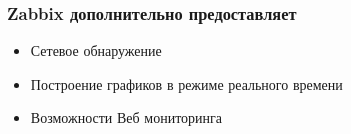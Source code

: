 \begin{frame}[fragile]
    \frametitle{Zabbix дополнительно предоставляет}
        \begin{itemize}
            \item Сетевое обнаружение
            \item Построение графиков в режиме реального времени
            \item Возможности Веб мониторинга
        \end{itemize}
\end{frame}